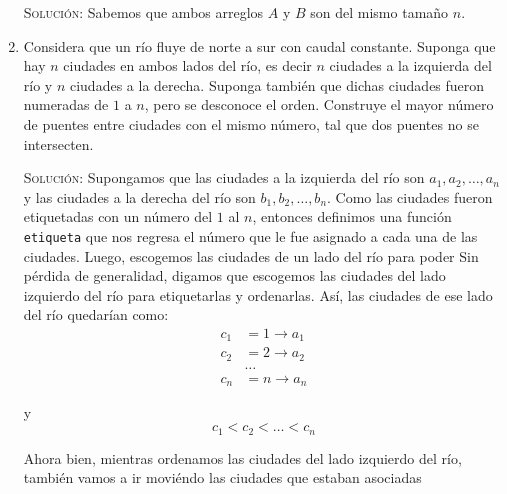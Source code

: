 \documentclass[letterpaper,11pt]{article}
\begin{document}
\begin{enumerate}
    \textsc{Solución:} Sabemos que ambos arreglos $A$ y $B$ son del mismo 
    tamaño $n$. 

    \item Considera que un río fluye de norte a sur con caudal constante. 
    Suponga que hay $n$ ciudades en ambos lados del río, es decir $n$ ciudades a 
    la izquierda del río y $n$ ciudades a la derecha. Suponga también que dichas 
    ciudades fueron numeradas de $1$ a $n$, pero se desconoce el orden. Construye 
    el mayor número de puentes entre ciudades con el mismo número, tal que dos 
    puentes no se intersecten. 

    \textsc{Solución:} Supongamos que las ciudades a la izquierda del río son 
    $a_1, a_2, \ldots, a_n$ y las ciudades a la derecha del río son $b_1, b_2, 
    \ldots, b_n$. Como las ciudades fueron etiquetadas con un número del $1$ al 
    $n$, entonces definimos una función \texttt{etiqueta} que nos regresa el 
    número que le fue asignado a cada una de las ciudades. Luego, escogemos las 
    ciudades de un lado del río para poder 
    Sin pérdida de generalidad, digamos que escogemos las ciudades del lado 
    izquierdo del río para etiquetarlas y ordenarlas. Así, las ciudades de ese 
    lado del río quedarían como: 
    \begin{align*}
        c_1 &= 1 \rightarrow a_1 \\
        c_2 &= 2 \rightarrow a_2 \\
        &\ldots \\
        c_n &= n \rightarrow a_n 
    \end{align*}

    y
    \begin{equation*}
    c_1 < c_2 < \ldots < c_n
    \end{equation*}

    Ahora bien, mientras ordenamos las ciudades del lado izquierdo del río, 
    también vamos a ir moviéndo las ciudades que estaban asociadas 

\end{enumerate}
\end{document}
